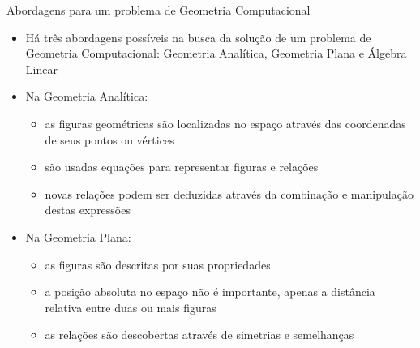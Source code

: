 \begin{frame}[fragile]{Abordagens para um problema de Geometria Computacional}

    \begin{itemize}
        \item Há três abordagens possíveis na busca da solução de um problema de Geometria
        Computacional: Geometria Analítica, Geometria Plana e Álgebra Linear

        \item Na Geometria Analítica:

        \begin{itemize}
            \item as figuras geométricas são localizadas no espaço através das coordenadas de seus pontos ou vértices
            \item são usadas equações para representar figuras e relações
            \item novas relações podem ser deduzidas através da combinação e manipulação destas expressões
        \end {itemize}

        \item Na Geometria Plana: 

        \begin{itemize}
            \item as figuras são descritas por suas propriedades
            \item a posição absoluta no espaço não é importante, apenas a distância relativa entre duas ou mais figuras
            \item as relações são descobertas através de simetrias e semelhanças
        \end{itemize}
    \end{itemize}

\end{frame}

